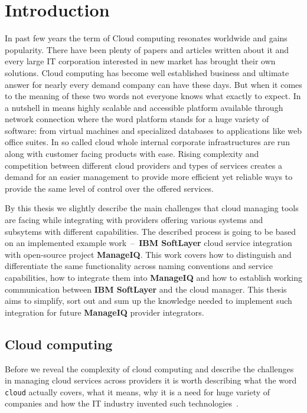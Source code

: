 
\chapter{Introduction}
\label{chap:Introduction}
In past few years the term of Cloud computing resonates worldwide and gains popularity. There have been plenty of papers and articles written about it and every large IT corporation interested in new market has brought their own solutions. Cloud computing has become well established business and ultimate answer for nearly every demand company can have these days. But when it comes to the meaning of these two words not everyone knows what exactly to expect. In a nutshell in means highly scalable and accessible platform available through network connection where the word platform stands for a huge variety of software: from virtual machines and specialized databases to applications like web office suites. In so called cloud whole internal corporate infrastructures are run along with customer facing products with ease. Rising complexity and competition between different cloud providers and types of services creates a demand for an easier management to provide more efficient yet reliable ways to provide the same level of control over the offered services.

By this thesis we slightly describe the main challenges that cloud managing tools are facing while integrating with providers offering various systems and subsytems with different capabilities. The described process is going to be based on an implemented example work \,--\, \textbf{IBM SoftLayer} cloud service integration with open-source project \textbf{ManageIQ}. This work covers how to distinguish and differentiate the same functionality across naming conventions and service capabilities, how to integrate them into \textbf{ManageIQ} and how to establish working communication between \textbf{IBM SoftLayer} and the cloud manager. This thesis aims to simplify, sort out and sum up the knowledge needed to implement such integration for future \textbf{ManageIQ} provider integrators.

\section{Cloud computing}
\label{sec:Cloud computing}
Before we reveal the complexity of cloud computing and describe the challenges in managing cloud services across providers it is worth describing what the word \texttt{cloud} actually covers, what it means, why it is a need for huge variety of companies and how the IT industry invented such technologies~\cite{cervone}.

